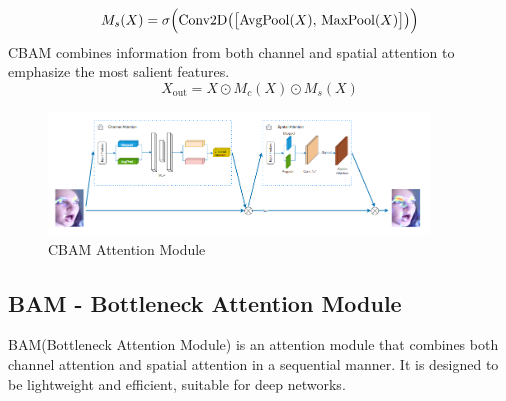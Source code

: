 \documentclass[pdflatex,sn-mathphys-num]{sn-jnl}%
\theoremstyle{thmstyleone}%
\theoremstyle{thmstyletwo}%
\theoremstyle{thmstylethree}%
\begin{document}
\begin{equation}\label{eq:cbam-spatial}
M_s(X) = \sigma\Bigl(\mathrm{Conv2D}\bigl(\bigl[\mathrm{AvgPool}(X),\,\mathrm{MaxPool}(X)\bigr]\bigr)\Bigr)
\end{equation}
CBAM\cite{b7} combines information from both channel and spatial attention to emphasize the most salient features.
\begin{equation}\label{eq:cbam-out}
X_{\mathrm{out}} = X \odot M_c(X) \odot M_s(X)
\end{equation}
\begin{figure}[h]
  \centering
  \includegraphics[width=0.9\textwidth]{Figures/CBAM.png}
   \caption{CBAM Attention Module}
  \label{fig:hinh-anh-6}
\end{figure}


\subsection{BAM - Bottleneck Attention Module}
BAM(Bottleneck Attention Module) \cite{b8} is an attention module that combines both channel attention and spatial attention in a sequential manner. It is designed to be lightweight and efficient, suitable for deep networks.
\end{document}
